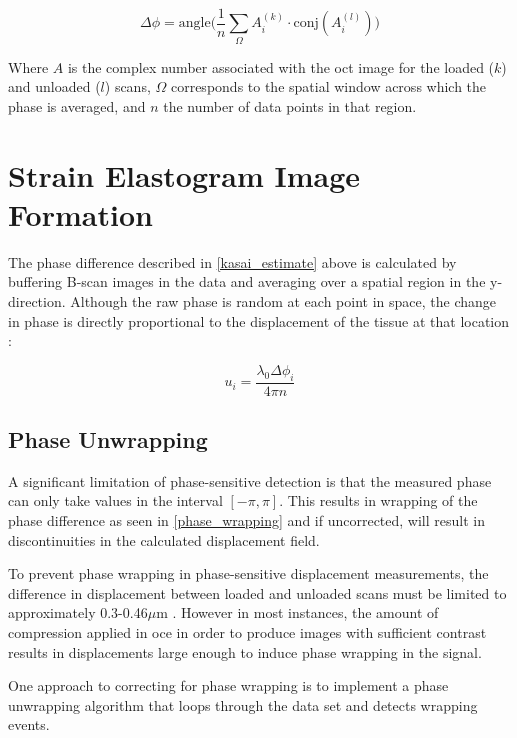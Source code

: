 \begin{equation}
	\Delta\phi = \text{angle}\bigg( \frac{1}{n} \sum_\Omega A_i^{(k)} \cdot \text{conj}(A_i^{(l)}) \bigg)
	\label{kasai_estimate}
\end{equation}

Where $A$ is the complex number associated with the \ac{oct} image for the loaded ($k$) and unloaded ($l$) scans, $\Omega$ corresponds to the spatial window across which the phase is averaged, and $n$ the number of data points in that region.

\section{Strain Elastogram Image Formation}

The phase difference described in \autoref{kasai_estimate} above is calculated by buffering B-scan images in the data and averaging over a spatial region in the y-direction. Although the raw phase is random at each point in space, the change in phase is directly proportional to the displacement of the tissue at that location \cite{wang_tissue_2006}:

\begin{equation}
	u_i = \frac{\lambda_0 \Delta\phi_i}{4\pi n}
	\label{phasedif_displacement}
\end{equation}

\subsection{Phase Unwrapping}

A significant limitation of phase-sensitive detection is that the measured phase can only take values in the interval $[-\pi,\pi]$. This results in wrapping of the phase difference as seen in \autoref{phase_wrapping} and if uncorrected, will result in discontinuities in the calculated displacement field.

To prevent phase wrapping in phase-sensitive displacement measurements, the difference in displacement between loaded and unloaded scans must be limited to approximately 0.3-0.46$\mu$m \cite{kennedy_optical_2014}. However in most instances, the amount of compression applied in \ac{oce} in order to produce images with sufficient contrast results in displacements large enough to induce phase wrapping in the signal. 

One approach to correcting for phase wrapping is to implement a phase unwrapping algorithm that loops through the data set and detects wrapping events. 


